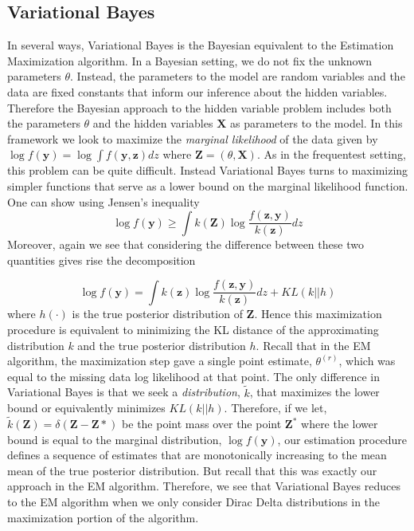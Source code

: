 \documentclass{article}
\begin{document}
\subsection{Variational Bayes}
In several ways, Variational Bayes is the Bayesian equivalent to the Estimation Maximization algorithm. In a Bayesian setting, we do not fix the unknown parameters $\theta$. Instead, the parameters to the model are random variables and the data are fixed constants that inform our inference about the hidden variables. Therefore the Bayesian approach to the hidden variable problem includes both the parameters $\theta$ and the hidden variables $\mathbf{X}$ as parameters to the model. In this framework we look to maximize the \textit{marginal likelihood} of the data given by $\log f(\mathbf{y}) = \log\int f(\mathbf{y},\mathbf{z})dz$ where $\mathbf{Z} = (\theta, \mathbf{X})$. As in the frequentest setting, this problem can be quite difficult. Instead Variational Bayes turns to maximizing simpler functions that serve as a lower bound on the marginal likelihood function. One can show using Jensen's inequality $$\log f(\mathbf{y}) \geq \int k(\mathbf{Z})\log\frac{f(\mathbf{z},\mathbf{y})}{k(\mathbf{z})}dz$$ Moreover, again we see that considering the difference between these two quantities gives rise the decomposition 

\begin{equation}
\log f(\mathbf{y}) = \int k(\mathbf{z})\log\frac{f(\mathbf{z},\mathbf{y})}{k(\mathbf{z})}dz + KL(k||h)
\end{equation}
where $h(\cdot)$ is the true posterior distribution of $\mathbf{Z}$. Hence this maximization procedure is equivalent to minimizing the KL distance of the approximating distribution $k$ and the true posterior distribution $h$. Recall that in the EM algorithm, the maximization step gave a single point estimate, $\theta^{(r)}$, which was equal to the missing data log likelihood at that point. The only difference in Variational Bayes is that we seek a \textit{distribution}, $\tilde{k}$, that maximizes the lower bound or equivalently minimizes $KL(k||h)$. Therefore, if we let,  $\tilde{k}(\mathbf{Z}) = \delta(\mathbf{Z} - \mathbf{Z}{*})$ be the point mass over the point $\mathbf{Z}^{*}$ where the lower bound is equal to the marginal distribution, $\log f(\mathbf{y})$, our estimation procedure defines a sequence of estimates that are monotonically increasing to the mean mean of the true posterior distribution. But recall that this was exactly our approach in the EM algorithm. Therefore, we see that Variational Bayes reduces to the EM algorithm when we only consider Dirac Delta distributions in the maximization portion of the algorithm. 
\end{document}

